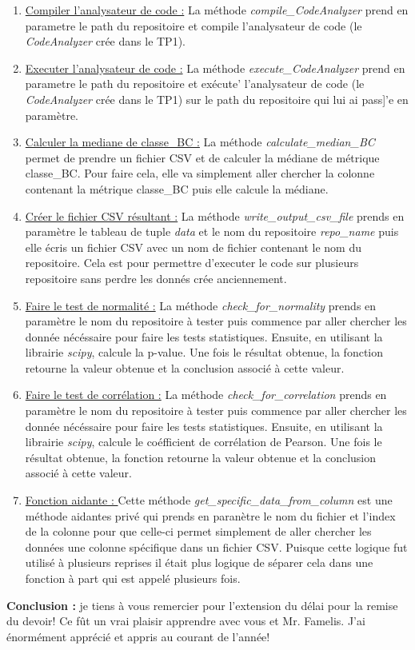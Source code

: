 \documentclass[11pt]{article}
\begin{document}
\begin{enumerate}
	\item \underline{Compiler l'analysateur de code :} La m\'ethode \textit{compile\_CodeAnalyzer} prend en parametre le path du repositoire et compile l'analysateur de code (le \textit{CodeAnalyzer} cr\'ee dans le TP1). 
	\item \underline{Executer l'analysateur de code :} La m\'ethode \textit{execute\_CodeAnalyzer} prend en parametre le path du repositoire et ex\'ecute' l'analysateur de code (le \textit{CodeAnalyzer} cr\'ee dans le TP1) sur le path du repositoire qui lui ai pass]'e en param\`etre. 
	\item \underline{Calculer la mediane de classe\_BC :} La m\'ethode \textit{calculate\_median\_BC} permet de prendre un fichier CSV et de calculer la médiane de m\'etrique classe\_BC. Pour faire cela, elle va simplement aller chercher la colonne contenant la m\'etrique classe\_BC puis elle calcule la m\'ediane.
	\item \underline{Cr\'eer le fichier CSV r\'esultant :} La m\'ethode \textit{write\_output\_csv\_file} prends en param\`etre le tableau de tuple \textit{data} et le nom du repositoire \textit{repo\_name} puis elle \'ecris un fichier CSV avec un nom de fichier contenant le nom du repositoire. Cela est pour permettre d'executer le code sur plusieurs repositoire sans perdre les donn\'es cr\'ee anciennement.
	\item \underline{Faire le test de normalit\'e :} La m\'ethode \textit{check\_for\_normality} prends en param\`etre le nom du repositoire \`a tester puis commence par aller chercher les donn\'ee n\'ec\'essaire pour faire les tests statistiques. Ensuite, en utilisant la librairie \textit{scipy}, calcule la p-value. Une fois le r\'esultat obtenue, la fonction retourne la valeur obtenue et la conclusion associ\'e \`a cette valeur.
	\item \underline{Faire le test de corr\'elation :} La m\'ethode \textit{check\_for\_correlation} prends en param\`etre le nom du repositoire \`a tester puis commence par aller chercher les donn\'ee n\'ec\'essaire pour faire les tests statistiques. Ensuite, en utilisant la librairie \textit{scipy}, calcule le co\'efficient de corr\'elation de Pearson. Une fois le r\'esultat obtenue, la fonction retourne la valeur obtenue et la conclusion associ\'e \`a cette valeur.
	\item \underline{Fonction aidante : } Cette méthode \textit{get\_specific\_data\_from\_column} est une méthode aidantes privé qui prends en paran\`etre le nom du fichier et l'index de la colonne pour que celle-ci permet simplement de aller chercher les donn\'ees une colonne spécifique dans un fichier CSV. Puisque cette logique fut utilisé à plusieurs reprises il était plus logique de séparer cela dans une fonction à part qui est appelé plusieurs fois.
\end{enumerate}

\textbf{Conclusion :}  je tiens \`a vous remercier pour l'extension du d\'elai pour la remise du devoir! Ce f\^ut un vrai plaisir apprendre avec vous et Mr. Famelis. J'ai \'enorm\'ement appr\'eci\'e et appris au courant de l'ann\'ee!
\end{document}
